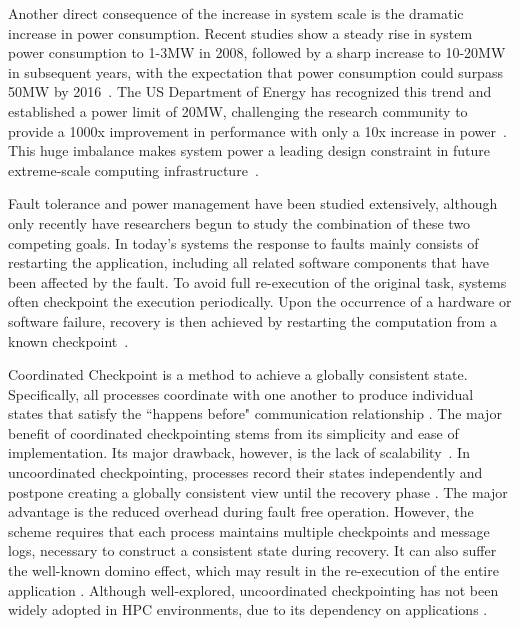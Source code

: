 Another direct consequence of the increase in system scale is the dramatic increase in power consumption. Recent studies show a steady rise in system power consumption to 1-3MW in 2008, followed by a sharp increase to 10-20MW in subsequent years, with the expectation that power consumption could surpass 50MW by 2016~\cite{doe_ascr_exascale_2011}. The US Department of Energy has recognized this trend and established a power limit of 20MW, challenging the research community to provide a 1000x improvement in performance with only a 10x increase in power~\cite{doe_ascr_exascale_2011}. %
This huge imbalance makes system power a leading design constraint in future extreme-scale computing infrastructure~\cite{Sarood2014,Villa2014}.


Fault tolerance and power management have been studied extensively, although only recently have researchers begun to study the combination of these two competing goals. In today's systems the response to faults mainly consists of restarting the application, including all related software components that have been affected by the fault. To avoid full re-execution of the original task, systems often checkpoint the execution periodically. Upon the occurrence of a hardware or software failure, recovery is then achieved by restarting the computation from a known checkpoint~\cite{Elnozahy:02:Survey}. 


Coordinated Checkpoint is a method to achieve a globally consistent state. Specifically, all processes
coordinate with one another to produce individual states that satisfy the ``happens before"
communication relationship \cite{chandy_trans_1972}. The major benefit of coordinated
checkpointing stems from its simplicity and ease of implementation. Its major drawback, however, is the
lack of scalability~\cite{elnozahy_dsc_2004,riesen_sandia_2010,hargrove2006berkeley}. In uncoordinated checkpointing, processes record their states independently and postpone creating a 
globally consistent view until the recovery phase \cite{plank_ftc_1999}. The major advantage is the reduced overhead during fault free operation. However, the scheme requires that
each process maintains multiple checkpoints and message logs, necessary to construct a consistent 
state during recovery. It can also suffer the well-known domino effect, which may result in the 
re-execution of the entire application \cite{randell_domino_effect}. Although well-explored, uncoordinated checkpointing has not been widely adopted
in HPC environments, due to its dependency on applications \cite{zheng_2004_ftccharm,guermouche_2011_ipdps}.

